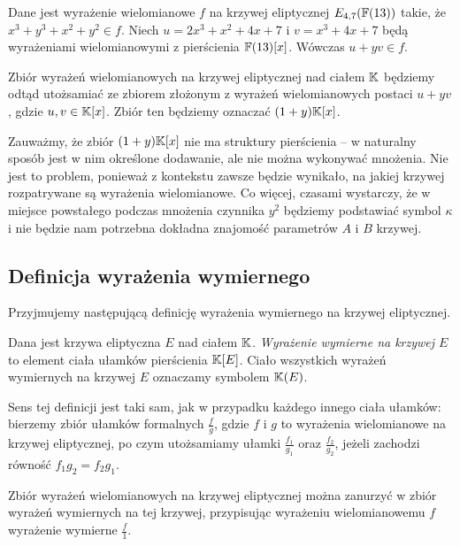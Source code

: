 \begin{example}
Dane jest wyrażenie wielomianowe $f$
na krzywej eliptycznej $E_{4,7}(\mathbb{F}(13))$ takie,
że $x^3 + y^3 + x^2 + y^2 \in f$.
Niech $u = 2x^3 + x^2 + 4x + 7$ i $v = x^3 + 4x + 7$
będą wyrażeniami wielomianowymi
z pierścienia $\mathbb{F}(13)[x]$.
Wówczas $u + yv \in f$.
\end{example}

\begin{remark}
Zbiór wyrażeń wielomianowych na krzywej eliptycznej nad ciałem $\mathbb{K}$
będziemy odtąd utożsamiać ze zbiorem
złożonym z wyrażeń wielomianowych postaci $u + yv$,
gdzie $u, v \in \mathbb{K}[x]$.
Zbiór ten będziemy oznaczać $(1 + y)\mathbb{K}[x]$.
\end{remark}

\noindent
Zauważmy, że zbiór $(1 + y)\mathbb{K}[x]$ nie ma struktury pierścienia --
w naturalny sposób jest w nim określone dodawanie,
ale nie można wykonywać mnożenia.
Nie jest to problem,
ponieważ z kontekstu zawsze będzie wynikało,
na jakiej krzywej rozpatrywane są wyrażenia wielomianowe.
Co więcej, czasami wystarczy,
że w miejsce powstałego podczas mnożenia czynnika $y^2$
będziemy podstawiać symbol $\kappa$
i nie będzie nam potrzebna dokładna znajomość parametrów $A$ i $B$ krzywej.

\subsection*{Definicja wyrażenia wymiernego}

\noindent
Przyjmujemy następującą definicję
wyrażenia wymiernego na krzywej eliptycznej.

\begin{definition}
Dana jest krzywa eliptyczna $E$ nad ciałem $\mathbb{K}$.
\emph{Wyrażenie wymierne na krzywej $E$}
to element ciała ułamków pierścienia $\mathbb{K}[E]$.
Ciało wszystkich wyrażeń wymiernych na krzywej $E$
oznaczamy symbolem $\mathbb{K}(E)$.
\end{definition}

\noindent
Sens tej definicji jest taki sam,
jak w przypadku każdego innego ciała ułamków:
bierzemy zbiór ułamków formalnych $\frac{f}{g}$,
gdzie $f$ i $g$ to wyrażenia wielomianowe na krzywej eliptycznej,
po czym utożsamiamy ułamki $\frac{f_1}{g_1}$ oraz $\frac{f_2}{g_2}$,
jeżeli zachodzi równość $f_1g_2 = f_2g_1$.

\begin{fact}
Zbiór wyrażeń wielomianowych na krzywej eliptycznej
można zanurzyć w zbiór wyrażeń wymiernych na tej krzywej,
przypisując wyrażeniu wielomianowemu $f$ wyrażenie wymierne $\frac{f}{1}$.
\end{fact}

